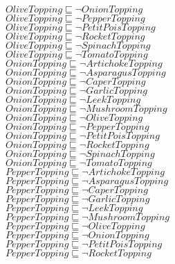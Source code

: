 \documentclass[a4paper,10pt]{article}
\begin{document}
 $OliveTopping \sqsubseteq  \lnot OnionTopping$\\ 
 $OliveTopping \sqsubseteq  \lnot PepperTopping$\\ 
 $OliveTopping \sqsubseteq  \lnot PetitPoisTopping$\\ 
 $OliveTopping \sqsubseteq  \lnot RocketTopping$\\ 
 $OliveTopping \sqsubseteq  \lnot SpinachTopping$\\ 
 $OliveTopping \sqsubseteq  \lnot TomatoTopping$\\ 
 $OnionTopping \sqsubseteq  \lnot ArtichokeTopping$\\ 
 $OnionTopping \sqsubseteq  \lnot AsparagusTopping$\\ 
 $OnionTopping \sqsubseteq  \lnot CaperTopping$\\ 
 $OnionTopping \sqsubseteq  \lnot GarlicTopping$\\ 
 $OnionTopping \sqsubseteq  \lnot LeekTopping$\\ 
 $OnionTopping \sqsubseteq  \lnot MushroomTopping$\\ 
 $OnionTopping \sqsubseteq  \lnot OliveTopping$\\ 
 $OnionTopping \sqsubseteq  \lnot PepperTopping$\\ 
 $OnionTopping \sqsubseteq  \lnot PetitPoisTopping$\\ 
 $OnionTopping \sqsubseteq  \lnot RocketTopping$\\ 
 $OnionTopping \sqsubseteq  \lnot SpinachTopping$\\ 
 $OnionTopping \sqsubseteq  \lnot TomatoTopping$\\ 
 $PepperTopping \sqsubseteq  \lnot ArtichokeTopping$\\ 
 $PepperTopping \sqsubseteq  \lnot AsparagusTopping$\\ 
 $PepperTopping \sqsubseteq  \lnot CaperTopping$\\ 
 $PepperTopping \sqsubseteq  \lnot GarlicTopping$\\ 
 $PepperTopping \sqsubseteq  \lnot LeekTopping$\\ 
 $PepperTopping \sqsubseteq  \lnot MushroomTopping$\\ 
 $PepperTopping \sqsubseteq  \lnot OliveTopping$\\ 
 $PepperTopping \sqsubseteq  \lnot OnionTopping$\\ 
 $PepperTopping \sqsubseteq  \lnot PetitPoisTopping$\\ 
 $PepperTopping \sqsubseteq  \lnot RocketTopping$\\ 
\end{document}
